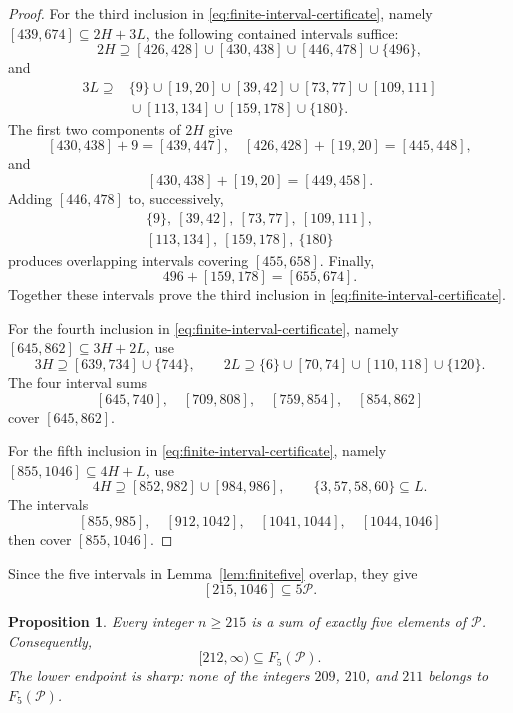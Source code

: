 \documentclass[12pt]{article}
\theoremstyle{plain}
\newtheorem{proposition}[theorem]{Proposition}
\theoremstyle{definition}
\theoremstyle{plain}
\newcommand{\Pset}{\mathcal{P}}
\begin{document}
\begin{proof}
For the third inclusion in
\eqref{eq:finite-interval-certificate}, namely
$[439,674]\subseteq2H+3L$, the following contained intervals suffice:
\[
 2H\supseteq[426,428]\cup[430,438]\cup[446,478]\cup\{496\},
\]
and
\[
\begin{split}
3L\supseteq{}&\{9\}\cup[19,20]\cup[39,42]\cup[73,77]
 \cup[109,111]\\
 &{}\cup[113,134]\cup[159,178]\cup\{180\}.
\end{split}
\]
The first two components of $2H$ give
\[
 [430,438]+9=[439,447],\quad
 [426,428]+[19,20]=[445,448],
\]
and
\[
 [430,438]+[19,20]=[449,458].
\]
Adding $[446,478]$ to, successively,
\[
\begin{gathered}
 \{9\},\ [39,42],\ [73,77],\ [109,111],\\
 [113,134],\ [159,178],\ \{180\}
\end{gathered}
\]
produces overlapping intervals covering $[455,658]$.  Finally,
\[
 496+[159,178]=[655,674].
\]
Together these intervals prove the third inclusion in
\eqref{eq:finite-interval-certificate}.

For the fourth inclusion in
\eqref{eq:finite-interval-certificate}, namely
$[645,862]\subseteq3H+2L$, use
\[
 3H\supseteq[639,734]\cup\{744\},\qquad
 2L\supseteq\{6\}\cup[70,74]\cup[110,118]\cup\{120\}.
\]
The four interval sums
\[
 [645,740],\quad[709,808],\quad[759,854],\quad[854,862]
\]
cover $[645,862]$.

For the fifth inclusion in
\eqref{eq:finite-interval-certificate}, namely
$[855,1046]\subseteq4H+L$, use
\[
 4H\supseteq[852,982]\cup[984,986],
 \qquad \{3,57,58,60\}\subseteq L.
\]
The intervals
\[
 [855,985],\quad[912,1042],\quad[1041,1044],\quad[1044,1046]
\]
then cover $[855,1046]$.
\end{proof}

Since the five intervals in Lemma~\ref{lem:finitefive} overlap, they give
\[
 [215,1046]\subseteq5\Pset.
\]

\begin{proposition}\label{prop:fiveP}
Every integer $n\geq215$ is a sum of exactly five elements of $\Pset$.
Consequently,
\[
 [212,\infty)\subseteq F_5(\Pset).
\]
The lower endpoint is sharp: none of the integers $209$, $210$, and
$211$ belongs to $F_5(\Pset)$.
\end{proposition}
\end{document}
